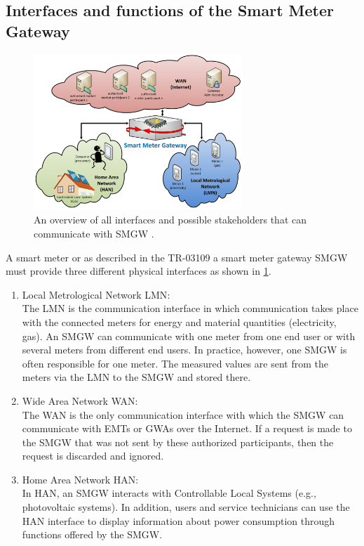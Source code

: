 \subsection{Interfaces and functions of the Smart Meter Gateway}
\begin{figure}[tbp]
  \centering
  \includegraphics[width=0.7\textwidth]{images/interfaces_eng.png}
  \caption[Smart Meter Gateway Interfaces]{An overview of all interfaces and possible stakeholders that can communicate with SMGW \cite{Anna}.}
  \label{fig:Smart_Meter_Interfaces}
\end{figure}
A smart meter or as described in the \gls{TR-03109} a smart meter gateway \gls{SMGW} must provide three different physical interfaces as shown in \ref{fig:Smart_Meter_Interfaces}.
\begin{enumerate}
\item Local Metrological Network \gls{LMN}:\\
The \gls{LMN} is the communication interface in which communication takes place with the connected meters for energy and material quantities (electricity, gas). An \gls{SMGW} can communicate with one meter from one end user or with several meters from different end users. In practice, however, one \gls{SMGW} is often responsible for one meter. The measured values are sent from the meters via the \gls{LMN} to the \gls{SMGW} and stored there.
\item Wide Area Network \gls{WAN}:\\
The \gls{WAN} is the only communication interface with which the \gls{SMGW} can communicate with \gls{EMT}s or \gls{GWA}s over the Internet. If a request is made to the \gls{SMGW} that was not sent by these authorized participants, then the request is discarded and ignored.
\item Home Area Network \gls{HAN}:\\
In \gls{HAN}, an \gls{SMGW} interacts with Controllable Local Systems (e.g., photovoltaic systems). In addition, users and service technicians can use the \gls{HAN} interface to display information about power consumption through functions offered by the \gls{SMGW}.
\end{enumerate}
